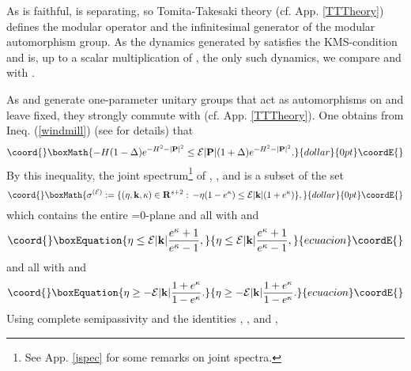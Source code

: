 \documentclass[a4paper,11pt]{article}
\def\dt{\cal}
\def\dM{{\dt M}}
\def\E{{\cal E}}
\def\gO{\Omega}
\def\go{\omega}
\def\impuls{k}
\def\reals{{\bf R}}
\begin{document}
As \myHighlight{$\go$}\coordHE{} is faithful, \myHighlight{$\gO$}\coordHE{} is separating, so Tomita-Takesaki theory
(cf. App. \ref{TTTheory}) defines the modular operator \myHighlight{$\Delta$}\coordHE{}
and the infinitesimal generator \coordHE{} of the modular automorphism
group. As the dynamics generated by \coordHE{} satisfies the KMS-condition
and is, up to a scalar multiplication of \coordHE{}, the only such dynamics,
we compare \coordHE{} and \coordHE{} with \coordHE{}.

As \coordHE{} and \coordHE{} generate one-parameter unitary groups that act as
automorphisms on \myHighlight{$\dM$}\coordHE{} and leave \myHighlight{$\gO$}\coordHE{} fixed, they strongly commute
with \coordHE{} (cf. App. \ref{TTTheory}).
One obtains from Ineq. (\ref{windmill}) (see \cite{PW78} for details) that
$$\coord{}\boxMath{-H(1-\Delta)e^{-H^2-|{\bf P}|^2}
\leq\E|{\bf P}|(1+\Delta)e^{-H^2-|{\bf P}|^2}.}{dollar}{0pt}\coordE{}$$
By this inequality, the joint spectrum\footnote{See App.
\ref{jspec} for some remarks on joint spectra.}
\coordHE{} of \coordHE{}, \coordHE{}, and \coordHE{} is a subset of
the set
$$\coord{}\boxMath{\sigma^{(\E)}:=\{(\eta,{\bf\impuls},\kappa)\in\reals^{s+2}:\,
-\eta (1-e^\kappa)\leq\E|{\bf\impuls}|(1+e^\kappa)\},}{dollar}{0pt}\coordE{}$$
which contains the entire \myHighlight{$\kappa$}\coordHE{}=0-plane and all
\myHighlight{$(\eta,{\bf k},\kappa)\in\reals^{s+2}$}\coordHE{}
with \coordHE{} and
\begin{equation}\coord{}\boxEquation{\label{constraint1}
\eta\leq\E|{\bf\impuls}|\frac{e^\kappa+1}{e^\kappa-1},
}{\eta\leq\E|{\bf\impuls}|\frac{e^\kappa+1}{e^\kappa-1},
}{ecuacion}\coordE{}\end{equation}
and all \myHighlight{$(\eta,{\bf k},\kappa)\in\reals^{s+2}$}\coordHE{} with \coordHE{} and
\begin{equation}\coord{}\boxEquation{\label{constraint2}
\eta\geq-\E|{\bf\impuls}|\frac{1+e^\kappa}{1-e^\kappa}.
}{\eta\geq-\E|{\bf\impuls}|\frac{1+e^\kappa}{1-e^\kappa}.
}{ecuacion}\coordE{}\end{equation}
Using complete semipassivity
and the identities \coordHE{}, \coordHE{}, and \coordHE{},
\end{document}
